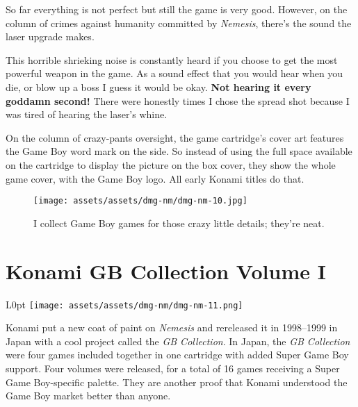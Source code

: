 \documentclass{book}
\begin{document}
So far everything is not perfect but still the game is very good. However, on the column of crimes against humanity committed by \emph{Nemesis}, there’s the sound the laser upgrade makes.



This horrible shrieking noise is constantly heard if you choose to get the most powerful weapon in the game. As a sound effect that you would hear when you die, or blow up a boss I guess it would be okay. \textbf{Not hearing it every goddamn second!} There were honestly times I chose the spread shot because I was tired of hearing the laser’s whine.

On the column of crazy-pants oversight, the game cartridge’s cover art features the Game Boy word mark on the side. So instead of using the full space available on the cartridge to display the picture on the box cover, they show the whole game cover, with the Game Boy logo. All early Konami titles do that.

\begin{figure}[hbt]
\vskip 10pt
\centering \texttt{[image: assets/assets/dmg-nm/dmg-nm-10.jpg]}\par\pagetwodescription I collect Game Boy games for those crazy little details; they’re neat.
\vskip 6pt
\end{figure}

\FloatBarrier\needspace{5pt}\section*{Konami GB Collection Volume I}\nopagebreak[4]

\begin{wrapfigure}{L}{0pt} \texttt{[image: assets/assets/dmg-nm/dmg-nm-11.png]}\end{wrapfigure}
Konami put a new coat of paint on \emph{Nemesis} and rereleased it in 1998–1999 in Japan with a cool project called the \emph{GB Collection}. In Japan, the \emph{GB Collection} were four games included together in one cartridge with added Super Game Boy support. Four volumes were released, for a total of 16 games receiving a Super Game Boy-specific palette. They are another proof that Konami understood the Game Boy market better than anyone.
\end{document}
